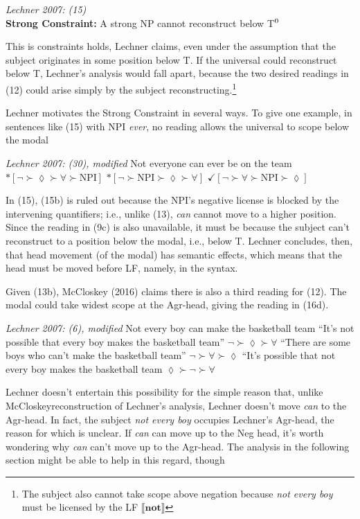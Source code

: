 \documentclass[]{ling-200b-2}
\newcommand*{\textsup}[1]{\ensuremath{^\textrm{{\scriptsize #1}}}}
\begin{document}
\ex \textit{Lechner 2007: (15)} \\ \textbf{Strong Constraint:} A strong NP cannot reconstruct below T\textsup{0}
\xe

\noindent This is constraints holds, Lechner claims, even under the assumption that the subject originates in some position below T. If the universal could reconstruct below T, Lechner's analysis would fall apart, because the two desired readings in (12) could arise simply by the subject reconstructing.\footnote{ The subject also cannot take scope above negation because \textit{not every boy} must be licensed by the LF $\llbracket \textbf{not} \rrbracket $}

Lechner motivates the Strong Constraint in several ways. To give one example, in sentences like (15) with NPI \textit{ever}, no reading allows the universal to scope below the modal
    
    \pex \textit{Lechner 2007: (30), modified}
    \small
    \a Not everyone can ever be on the team 
    \a $*[\neg \succ \lozenge \succ \forall \succ \textrm{NPI}]$
    \a $*[\neg \succ \textrm{NPI} \succ \lozenge \succ \forall]$
    \a $\checkmark[\neg \succ \forall \succ \textrm{NPI} \succ \lozenge]$ 
    \xe

In (15), (15b) is ruled out because the NPI's negative license is blocked by the intervening quantifiers; i.e., unlike (13), \textit{can} cannot move to a higher position. Since the reading in (9c) is also unavailable, it must be because the subject can't reconstruct to a position below the modal, i.e., below T. Lechner concludes, then, that head movement (of the modal) has semantic effects, which means that the head must be moved before LF, namely, in the syntax.

Given (13b), McCloskey (2016) claims there is also a third reading for (12). The modal could take widest scope at the Agr-head, giving the reading in (16d).

\pex \textit{Lechner 2007: (6), modified}
\a Not every boy can make the basketball team
\a ``It's not possible that every boy makes the basketball team'' \hfill $\neg \succ \lozenge \succ \forall$
\a ``There are some boys who can't make the basketball team'' \hfill $\neg \succ \forall \succ \lozenge$
\a ``It's possible that not every boy makes the basketball team \hfill $\lozenge \succ \neg \succ \forall$
\xe

\noindent Lechner doesn't entertain this possibility for the simple reason that, unlike McCloskey\s reconstruction of Lechner's analysis, Lechner doesn't move \textit{can} to the Agr-head. In fact, the subject \textit{not every boy} occupies Lechner's Agr-head, the reason for which is unclear. If \textit{can} can move up to the Neg head, it's worth wondering why \textit{can} can't move up to the Agr-head. The analysis in the following section might be able to help in this regard, though 
\end{document}

